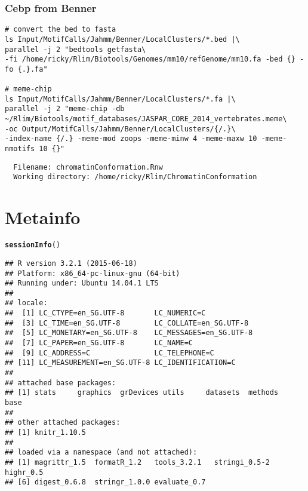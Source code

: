 \documentclass{article}\usepackage[]{graphicx}\usepackage[]{color}
\makeatletter
\newcommand{\hlstd}[1]{\textcolor[rgb]{0.345,0.345,0.345}{#1}}%
\newcommand{\hlkwd}[1]{\textcolor[rgb]{0.737,0.353,0.396}{\textbf{#1}}}%
\newenvironment{kframe}{%
 \def\at@end@of@kframe{}%
 \ifinner\ifhmode%
  \def\at@end@of@kframe{\end{minipage}}%
  \begin{minipage}{\columnwidth}%
 \fi\fi%
 \def\FrameCommand##1{\hskip\@totalleftmargin \hskip-\fboxsep
 \colorbox{shadecolor}{##1}\hskip-\fboxsep
     \hskip-\linewidth \hskip-\@totalleftmargin \hskip\columnwidth}%
 \MakeFramed {\advance\hsize-\width
   \@totalleftmargin\z@ \linewidth\hsize
   \@setminipage}}%
 {\par\unskip\endMakeFramed%
 \at@end@of@kframe}
\newenvironment{knitrout}{}{} %
\makeatother
\begin{document}
\subsubsection{Cebp from Benner}
\begin{verbatim}
# convert the bed to fasta
ls Input/MotifCalls/Jahmm/Benner/LocalClusters/*.bed |\ 
parallel -j 2 "bedtools getfasta\ 
-fi /home/ricky/Rlim/Biotools/Genomes/mm10/refGenome/mm10.fa -bed {} -fo {.}.fa"

# meme-chip
ls Input/MotifCalls/Jahmm/Benner/LocalClusters/*.fa |\ 
parallel -j 2 "meme-chip -db ~/Rlim/Biotools/motif_databases/JASPAR_CORE_2014_vertebrates.meme\ 
-oc Output/MotifCalls/Jahmm/Benner/LocalClusters/{/.}\ 
-index-name {/.} -meme-mod zoops -meme-minw 4 -meme-maxw 10 -meme-nmotifs 10 {}"
\end{verbatim}


\begin{verbatim}
  Filename: chromatinConformation.Rnw
  Working directory: /home/ricky/Rlim/ChromatinConformation 
\end{verbatim}

\section{Metainfo}
\begin{knitrout}
\definecolor{shadecolor}{rgb}{0.969, 0.969, 0.969}\color{fgcolor}\begin{kframe}
\begin{alltt}
\hlkwd{sessionInfo}\hlstd{()}
\end{alltt}
\begin{verbatim}
## R version 3.2.1 (2015-06-18)
## Platform: x86_64-pc-linux-gnu (64-bit)
## Running under: Ubuntu 14.04.1 LTS
## 
## locale:
##  [1] LC_CTYPE=en_SG.UTF-8       LC_NUMERIC=C              
##  [3] LC_TIME=en_SG.UTF-8        LC_COLLATE=en_SG.UTF-8    
##  [5] LC_MONETARY=en_SG.UTF-8    LC_MESSAGES=en_SG.UTF-8   
##  [7] LC_PAPER=en_SG.UTF-8       LC_NAME=C                 
##  [9] LC_ADDRESS=C               LC_TELEPHONE=C            
## [11] LC_MEASUREMENT=en_SG.UTF-8 LC_IDENTIFICATION=C       
## 
## attached base packages:
## [1] stats     graphics  grDevices utils     datasets  methods   base     
## 
## other attached packages:
## [1] knitr_1.10.5
## 
## loaded via a namespace (and not attached):
## [1] magrittr_1.5  formatR_1.2   tools_3.2.1   stringi_0.5-2 highr_0.5    
## [6] digest_0.6.8  stringr_1.0.0 evaluate_0.7
\end{verbatim}
\end{kframe}
\end{knitrout}
\end{document}
